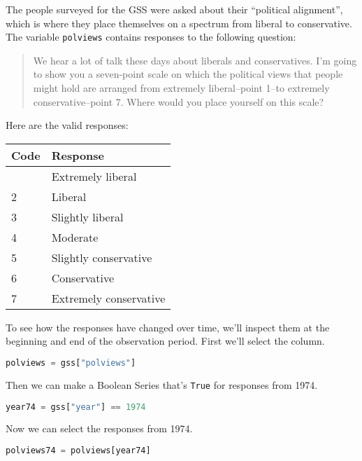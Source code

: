 The people surveyed for the GSS were asked about their ``political
alignment'', which is where they place themselves on a spectrum from
liberal to conservative. The variable \passthrough{\lstinline!polviews!}
contains responses to the following question:

\begin{quote}
We hear a lot of talk these days about liberals and conservatives. I'm
going to show you a seven-point scale on which the political views that
people might hold are arranged from extremely liberal--point 1--to
extremely conservative--point 7. Where would you place yourself on this
scale?
\end{quote}

Here are the valid responses:

\begin{longtable}[]{@{}ll@{}}
\midrule\noalign{}
Code & Response \\
\midrule\noalign{}
\endhead
\midrule\noalign{}
\endlastfoot
1 & Extremely liberal \\
2 & Liberal \\
3 & Slightly liberal \\
4 & Moderate \\
5 & Slightly conservative \\
6 & Conservative \\
7 & Extremely conservative \\
\end{longtable}

To see how the responses have changed over time, we'll inspect them at
the beginning and end of the observation period. First we'll select the
column.

\begin{lstlisting}[language=Python,style=source]
polviews = gss["polviews"]
\end{lstlisting}

Then we can make a Boolean Series that's \passthrough{\lstinline!True!}
for responses from 1974.

\begin{lstlisting}[language=Python,style=source]
year74 = gss["year"] == 1974
\end{lstlisting}

Now we can select the responses from 1974.

\begin{lstlisting}[language=Python,style=source]
polviews74 = polviews[year74]
\end{lstlisting}

